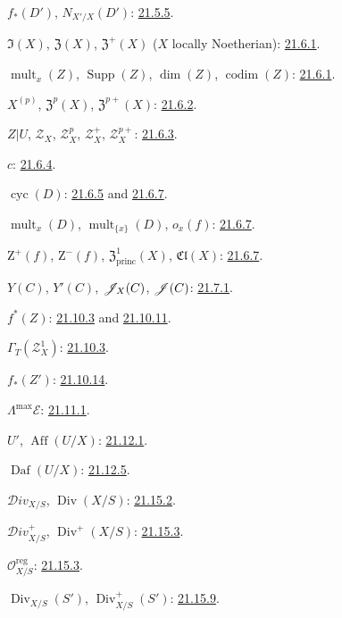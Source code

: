 $f_*(D')$, $N_{X'/X}(D')$: {\hyperref[IV.21.5.5]{21.5.5}}.

$\mathfrak I(X)$, $\mathfrak Z(X)$, $\mathfrak Z^+(X)$
($X$ locally Noetherian): {\hyperref[IV.21.6.1]{21.6.1}}.

$\operatorname{mult}_x(Z)$, $\operatorname{Supp}(Z)$,
$\dim(Z)$, $\operatorname{codim}(Z)$: {\hyperref[IV.21.6.1]{21.6.1}}.

$X^{(p)}$, $\mathfrak Z^p(X)$, $\mathfrak Z^{p+}(X)$:
{\hyperref[IV.21.6.2]{21.6.2}}.

$Z|U$, $\mathscr Z_X$, $\mathscr Z_X^p$, $\mathscr Z_X^+$,
$\mathscr Z_X^{p+}$: {\hyperref[IV.21.6.3]{21.6.3}}.

$c$: {\hyperref[IV.21.6.4]{21.6.4}}.

$\operatorname{cyc}(D)$: {\hyperref[IV.21.6.5]{21.6.5}} and
{\hyperref[IV.21.6.7]{21.6.7}}.

$\operatorname{mult}_x(D)$, $\operatorname{mult}_{\{x\}}(D)$,
$o_x(f)$: {\hyperref[IV.21.6.7]{21.6.7}}.

$\mathrm Z^+(f)$, $\mathrm Z^-(f)$, $\mathfrak Z^1_{\mathrm{princ}}(X)$,
$\mathfrak{Cl}(X)$: {\hyperref[IV.21.6.7]{21.6.7}}.

$Y(C)$, $Y'(C)$, $\mathscr{J}_X(C)$, $\mathscr{J}(C)$:
{\hyperref[IV.21.7.1]{21.7.1}}.

$f^*(Z)$: {\hyperref[IV.21.10.3]{21.10.3}} and {\hyperref[IV.21.10.11]{21.10.11}}.

$\Gamma_T(\mathscr Z_X^1)$: {\hyperref[IV.21.10.3]{21.10.3}}.

$f_*(Z')$: {\hyperref[IV.21.10.14]{21.10.14}}.

$\Lambda^{\max}\mathcal E$: {\hyperref[IV.21.11.1]{21.11.1}}.

$U'$, $\operatorname{Aff}(U/X)$: {\hyperref[IV.21.12.1]{21.12.1}}.

$\operatorname{Daf}(U/X)$: {\hyperref[IV.21.12.5]{21.12.5}}.

$\mathcal{D}iv_{X/S}$, $\operatorname{Div}(X/S)$:
{\hyperref[IV.21.15.2]{21.15.2}}.

$\mathcal{D}iv_{X/S}^+$, $\operatorname{Div}^+(X/S)$:
{\hyperref[IV.21.15.3]{21.15.3}}.

$\mathcal O_{X/S}^{\mathrm{reg}}$: {\hyperref[IV.21.15.3]{21.15.3}}.

$\operatorname{Div}_{X/S}(S')$, $\operatorname{Div}_{X/S}^+(S')$:
{\hyperref[IV.21.15.9]{21.15.9}}.

\endgroup
